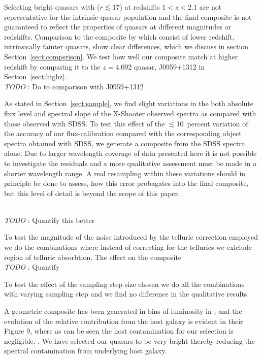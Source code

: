 \documentclass{aa}    %
\newcommand{\sectionname}{Section}
\newcommand{\Sect}[1]{\sectionname~\ref{sect:#1}}
\newcommand{\sect}[1]{\Sect{#1}}
\newcommand{\todo}[3]{{\color{#2}\emph{#1}: #3}}
\newcommand{\jstodo}[1]{\todo{ \\TODO }{red}{#1}}
\begin{document}
Selecting bright quasars with ($r \lesssim 17$) at redshifts $1 < z < 2.1$ are not representative for the intrinsic quasar population \citep{Paris2014} and the final composite is not guaranteed to reflect the properties of quasars at different magnitudes or redshifts. Comparison to the composite by \citep{VandenBerk2001} which consist of lower redshift, intrinsically fainter quasars, show clear differences, which we discuss in section \sect{compsrison}. We test how well our composite match at higher redshift by comparing it to the $z=4.092$ quasar, J0959+1312 in \sect{highz}.
\jstodo{Do to comparison with J0959+1312}





As stated in \sect{sample}, we find slight variations in the both absolute flux level and spectral slope of the X-Shooter observed spectra as compared with those observed with SDSS. To test this effect of the $\lesssim$10~percent variation of the accuracy of our flux-calibration compared with the corresponding object spectra obtained with SDSS, we generate a composite from the SDSS spectra alone. Due to larger wavelength coverage of data presented here it is not possible to investigate the residuals and a more qualitative assessment must be made in a shorter wavelength range.
A real resampling within these variations should in principle be done to assess, how this error probagates into the final composite, but this level of detail is beyond the scope of this paper. 

\jstodo{Quantify this better}



To test the magnitude of the noise introduced by the telluric correction employed we do the combinations where instead of correcting for the tellurics we exlclude region of telluric absorbtion. The effect on the composite  
\jstodo{Quantify}


To test the effect of the sampling step size chosen we do all the combinations with varying sampling step and we find no difference in the qualitative results. 

 
 
A geometric composite has been generated in bins of luminosity in \citep{Shen2011}, and the evolution of the relative contribution from the host galaxy is evident in their Figure 9, where as can be seen the host contamination for our selection is negligible.
 \citep{Volonteri2010a} \citep{Hopkins2007} . We have selected our quasars to be very bright thereby reducing the spectral contamination from underlying host galaxy. 
\end{document}
